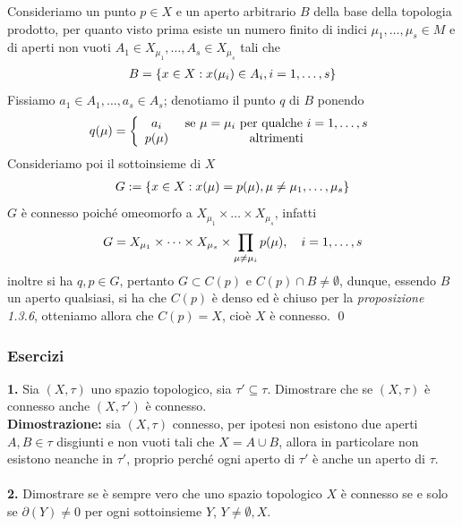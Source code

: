 \documentclass{article}
\begin{document}
Consideriamo un punto $p \in X$ e un aperto arbitrario $B$ della base della topologia prodotto, per quanto visto prima esiste un numero finito di indici $\mu_1, \dots, \mu_s \in M$ e di aperti non vuoti $A_1 \in X_{\mu_1}, \dots, A_s \in X_{\mu_s}$ tali che
\begin{gather}
    B = \{ x \in X : x(\mu_i) \in A_i, i = 1, \dots, s \} \notag
\end{gather}
Fissiamo $a_1 \in A_1, \dots, a_s \in A_s$; denotiamo il punto $q$ di $B$ ponendo
\begin{gather}
    q(\mu) = \left\{ \begin{array}{cc} 
         a_i& \text{ se } \mu = \mu_i \text{ per qualche } i = 1, \dots, s  \\
         p(\mu)& \text{ altrimenti} \notag
    \end{array} \right.
\end{gather}
Consideriamo poi il sottoinsieme di $X$
\begin{gather}
    G := \{ x \in X : x(\mu) = p(\mu), \mu \neq \mu_1, \dots, \mu_s \} \notag
\end{gather}
$G$ è connesso poiché omeomorfo a $X_{\mu_1} \times \dots \times X_{\mu_s}$, infatti
\begin{gather}
    G = X_{\mu_1} \times \dots \times X_{\mu_s} \times \prod_{\mu \neq \mu_i} p(\mu), \quad i = 1, \dots, s \notag
\end{gather}
inoltre si ha $q, p \in G$, pertanto $G \subset C(p)$ e $C(p) \cap B \neq \emptyset$, dunque, essendo $B$ un aperto qualsiasi, si ha che $C(p)$ è denso ed è chiuso per la \textit{proposizione 1.3.6}, otteniamo allora che $C(p) = X$, cioè $X$ è connesso. \qed
\subsubsection{Esercizi}
\textbf{1.} Sia $(X, \tau)$ uno spazio topologico, sia $\tau' \subseteq \tau$. Dimostrare che se $(X, \tau)$ è connesso anche $(X, \tau')$ è connesso. \\

\textbf{Dimostrazione:} sia $(X, \tau)$ connesso, per ipotesi non esistono due aperti $A, B \in \tau$ disgiunti e non vuoti tali che $X = A \cup B$, allora in particolare non esistono neanche in $\tau'$, proprio perché ogni aperto di $\tau'$ è anche un aperto di $\tau$. \\ \\
\textbf{2.} Dimostrare se è sempre vero che uno spazio topologico $X$ è connesso se e solo se $\partial(Y) \neq 0$ per ogni sottoinsieme $Y$, $Y \neq \emptyset, X$. \\
\end{document}
